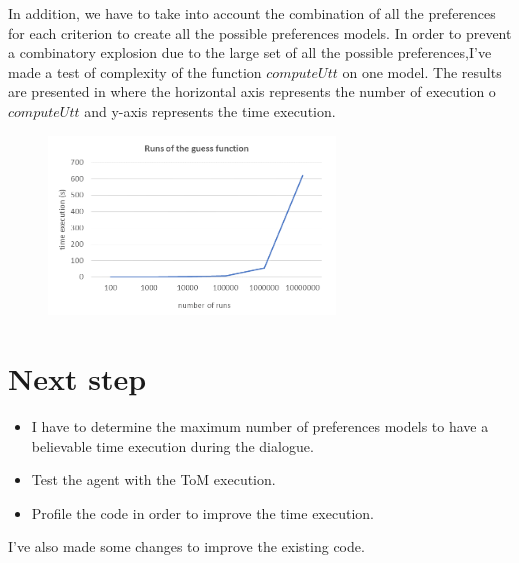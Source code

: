 \documentclass{llncs}
\begin{document}
	In addition, we have to take into account the combination of all the preferences for each criterion to create all the possible preferences models.
	In order to prevent a combinatory explosion due to the large set of all the possible preferences,I've made a test of complexity of the function $computeUtt$ on one model. The results are presented in  where the horizontal axis represents the number of execution o$computeUtt$ and y-axis represents the time execution. 

		 \begin{figure} [t]
		 	\centerline{\includegraphics[width=3in]{figs/graph.png}}
		 	\vskip 8pt
		 \end{figure}

 
 \section{Next step}
 \begin{itemize}
	\item   I have to determine the maximum number of preferences models to have a believable time execution during the dialogue.
	\item Test the agent with the ToM execution.
	\item Profile the code in order to improve the time execution.
 \end{itemize}
 
 I've also made some changes to improve the existing code. 

%
%

\
\end{document}
